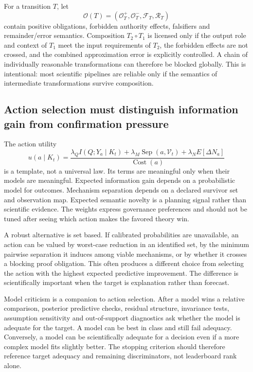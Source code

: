 For a transition \(T\), let
\[
\mathcal O(T)=
(\mathcal O_T^+,\mathcal O_T^-,\mathcal F_T,\mathcal R_T)
\]
contain positive obligations, forbidden authority effects, falsifiers and remainder/error semantics. Composition \(T_2\circ T_1\) is licensed only if the output role and context of \(T_1\) meet the input requirements of \(T_2\), the forbidden effects are not crossed, and the combined approximation error is explicitly controlled. A chain of individually reasonable transformations can therefore be blocked globally. This is intentional: most scientific pipelines are reliable only if the semantics of intermediate transformations survive composition.

\subsection{Action selection must distinguish information gain from confirmation pressure}

The action utility
\[
u(a\mid K_t)=
\frac{\lambda_Q I(Q;Y_a\mid K_t)+
\lambda_M\operatorname{Sep}(a,\mathcal V_t)+
\lambda_N E[\Delta N_a]}{\operatorname{Cost}(a)}
\]
is a template, not a universal law. Its terms are meaningful only when their models are meaningful. Expected information gain depends on a probabilistic model for outcomes. Mechanism separation depends on a declared survivor set and observation map. Expected semantic novelty is a planning signal rather than scientific evidence. The weights express governance preferences and should not be tuned after seeing which action makes the favored theory win.

A robust alternative is set based. If calibrated probabilities are unavailable, an action can be valued by worst-case reduction in an identified set, by the minimum pairwise separation it induces among viable mechanisms, or by whether it crosses a blocking proof obligation. This often produces a different choice from selecting the action with the highest expected predictive improvement. The difference is scientifically important when the target is explanation rather than forecast.

Model criticism is a companion to action selection. After a model wins a relative comparison, posterior predictive checks, residual structure, invariance tests, assumption sensitivity and out-of-support diagnostics ask whether the model is adequate for the target. A model can be best in class and still fail adequacy. Conversely, a model can be scientifically adequate for a decision even if a more complex model fits slightly better. The stopping criterion should therefore reference target adequacy and remaining discriminators, not leaderboard rank alone.

